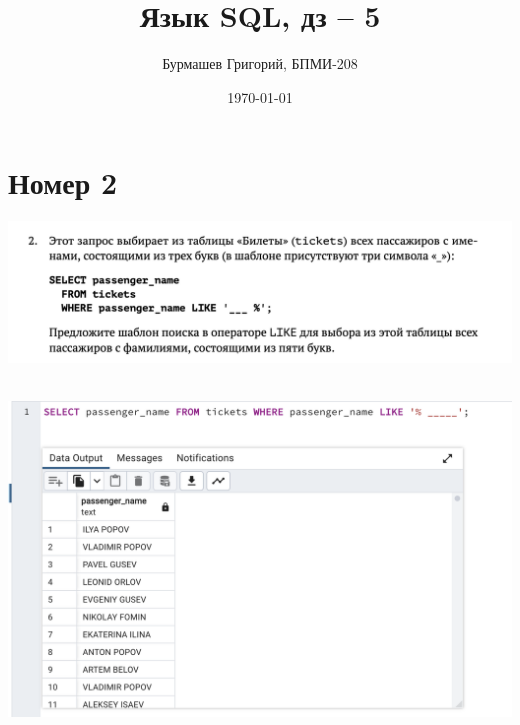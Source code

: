\documentclass[a4paper,12pt]{article}
\author{Бурмашев Григорий, БПМИ-208}
\title{Язык SQL, дз -- 5}
\date{\today}
\begin{document}
\maketitle
\clearpage
\section*{Номер 2}
\includegraphics[scale=0.6]{t2.png}
\\\\
\begin{center}
\includegraphics[scale=0.5]{21.png}
\end{center}
\clearpage
\end{document}
